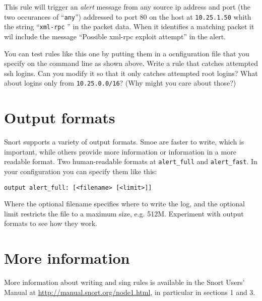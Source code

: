 \documentclass{article}
\begin{document}
This rule will trigger an \emph{alert} message from any source ip address and port (the two occurances of ``\texttt{any}'') addressed to port 80 on the host at \texttt{10.25.1.50} whith the string ``\texttt{xml-rpc} '' in the packet data.  When it identifies a matching packet it wil include the message ``Possible xml-rpc exploit attempt'' in the alert.

You can test rules like this one by putting them in a ocnfiguration file that you specify on the command line as shown above.  Write a rule that catches attempted ssh logins.  Can you modify it so that it only catches attempted root logins?  What about logins only from \texttt{10.25.0.0/16}? (Why might you care about those?)

\section{Output formats}
Snort supports a variety of output formats.  Smoe are faster to write, which is important, while others provide more information or information in a more readable format.  Two human-readable formats at \texttt{alert\_full} and \texttt{alert\_fast}. In your configuration you can specify them like this:

\begin{verbatim}
output alert_full: [<filename> [<limit>]]
\end{verbatim}

Where the optional filename specifies where to write the log, and the optional limit restricts the file to a maximum size, e.g. 512M. Experiment with output formats to see how they work.


\section{More information}
More information about writing and sing rules is available in the Snort Users' Manual at \url{http://manual.snort.org/node1.html}, in particular in sections 1 and 3.
\end{document}
